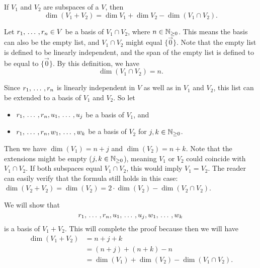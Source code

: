 \begin{thm} 
\label{thm: dimension of a sum of subspaces}
If $V_1$ and $V_2$ are subspaces of a \fdvs $V$, then
\begin{equation}
  \dim (V_1 + V_2) = \dim V_1 + \dim V_2 - \dim (V_1 \cap V_2).
\end{equation}
\end{thm}
\begin{prf}
Let $r_1, {\, \ldots \,\,}, r_n \in V$ be a basis of $V_1 \cap V_2$, where $n \in \mathbb{N}_{\geq 0}$. This means the basis can also be the empty list, and $V_1 \cap V_2$ might equal $\{ \vec 0 \}$. Note that the empty list is defined to be linearly independent, and the span of the empty list is defined to be equal to $\{ \vec 0 \}$. By this definition, we have
\[
\dim(V_1 \cap V_2) = n.
\]

Since $r_1, {\, \ldots \,\,}, r_n$ is linearly independent in $V$ as well as in $V_1$ and $V_2$, this list can be extended to a basis of $V_1$ and $V_2$. So let
\begin{itemize}
  \item $r_1, {\, \ldots \,\,}, r_n, u_1, {\, \ldots \,\,}, u_j$ be a basis of $V_1$, and
  \item $r_1, {\, \ldots \,\,}, r_n, w_1, {\, \ldots \,\,}, w_k$ be a basis of $V_2$ for $j,k \in \mathbb{N}_{\geq 0}$.
\end{itemize}

Then we have $\dim (V_1) = n+j$ and $\dim(V_2) = n+k$. Note that the extensions might be empty ($j,k \in \mathbb{N}_{\geq 0}$), meaning $V_1$ or $V_2$ could coincide with $V_1 \cap V_2$. If both subspaces equal $V_1 \cap V_2$, this would imply $V_1 = V_2$. The reader can easily verify that the formula still holds in this case: $\dim (V_2+V_2) = \dim (V_2) = 2 \cdot \dim (V_2) - \dim (V_2 \cap V_2)$.

We will show that
\begin{equation}
  \label{eq: basis with r's, u's and w's}
  r_1, {\, \ldots \,\,}, r_n, u_1, {\, \ldots \,\,}, u_j, w_1, {\, \ldots \,\,}, w_k
\end{equation}
is a basis of $V_1 + V_2$. This will complete the proof because then we will have
\begin{equation}
  \begin{aligned}
    \dim (V_1 + V_2) &= n + j + k \\
    &= (n+j) + (n+k) - n \\
    &= \dim (V_1) + \dim (V_2) - \dim (V_1 \cap V_2).
  \end{aligned}
\end{equation}


\end{prf}
